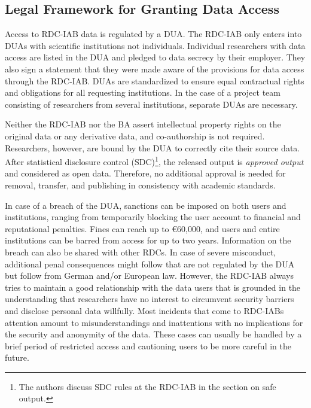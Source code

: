 \hypertarget{legal-framework-for-granting-data-access}{%
\subsection{Legal Framework for Granting Data Access}\label{legal-framework-for-granting-data-access}}

Access to RDC-IAB data is regulated by a DUA. The RDC-IAB only enters into DUAs with scientific institutions not individuals. Individual researchers with data access are listed in the DUA and pledged to data secrecy by their employer. They also sign a statement that they were made aware of the provisions for data access through the RDC-IAB. DUAs are standardized to ensure equal contractual rights and obligations for all requesting institutions. In the case of a project team consisting of researchers from several institutions, separate DUAs are necessary.

Neither the RDC-IAB nor the BA assert intellectual property rights on the original data or any derivative data, and co-authorship is not required. Researchers, however, are bound by the DUA to correctly cite their source data. After statistical disclosure control (SDC)\footnote{The authors discuss SDC rules at the RDC-IAB in the section on safe output.}, the released output is \emph{approved output} and considered as open data. Therefore, no additional approval is needed for removal, transfer, and publishing in consistency with academic standards.

In case of a breach of the DUA, sanctions can be imposed on both users and institutions, ranging from temporarily blocking the user account to financial and reputational penalties. Fines can reach up to €60,000, and users and entire institutions can be barred from access for up to two years. Information on the breach can also be shared with other RDCs. In case of severe misconduct, additional penal consequences might follow that are not regulated by the DUA but follow from German and/or European law. However, the RDC-IAB always tries to maintain a good relationship with the data users that is grounded in the understanding that researchers have no interest to circumvent security barriers and disclose personal data willfully. Most incidents that come to RDC-IABs attention amount to misunderstandings and inattentions with no implications for the security and anonymity of the data. These cases can usually be handled by a brief period of restricted access and cautioning users to be more careful in the future.

